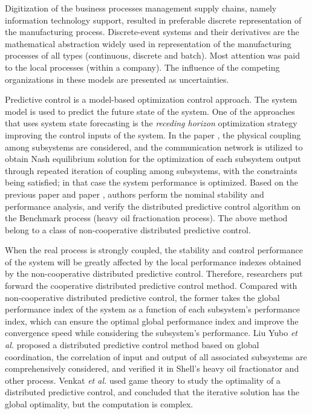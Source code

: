 \documentclass[runningheads]{llncs}
\begin{document}
Digitization of the business processes management supply chains, namely information technology support, resulted in preferable discrete representation of the manufacturing process. Discrete-event systems and their derivatives are the mathematical abstraction widely used in representation of the manufacturing processes of all types (continuous, discrete and batch). Most attention was paid to the local processes (within a company). The influence of the competing organizations in these models are presented as uncertainties.

Predictive control is a model-based optimization control approach. The system model is used to predict the future state of the system. One of the approaches that uses system state forecasting is the \emph{receding horizon} optimization strategy improving the control inputs of the system. In the paper \cite{dux}, the physical coupling among subsystems are considered, and the communication network is utilized to obtain Nash equilibrium solution for the optimization of each subsystem output through repeated iteration of coupling among subsystems, with the constraints being satisfied; in that case the system performance is optimized. Based on the previous paper \cite{dux} and paper \cite{lis}, authors perform the nominal stability and performance analysis, and verify the distributed predictive control algorithm on the Benchmark process (heavy oil fractionation process). The above method belong to a class of non-cooperative distributed predictive control.

When the real process is strongly coupled, the stability and control performance of the system will be greatly affected by the local performance indexes obtained by the non-cooperative distributed predictive control. Therefore, researchers put forward the cooperative distributed predictive control method. Compared with non-cooperative distributed predictive control, the former takes the global performance index of the system as a function of each subsystem's performance index, which can ensure the optimal global performance index and improve the convergence speed while considering the subsystem's performance. Liu Yubo \emph{et al.} \cite{liuy} proposed a distributed predictive control method based on global coordination, the correlation of input and output of all associated subsystems are comprehensively considered, and verified it in Shell's heavy oil fractionator and other process. Venkat \emph{et al.} \cite{venkat} used game theory to study the optimality of a distributed predictive control, and concluded that the iterative solution has the global optimality, but the computation is complex.
\end{document}
